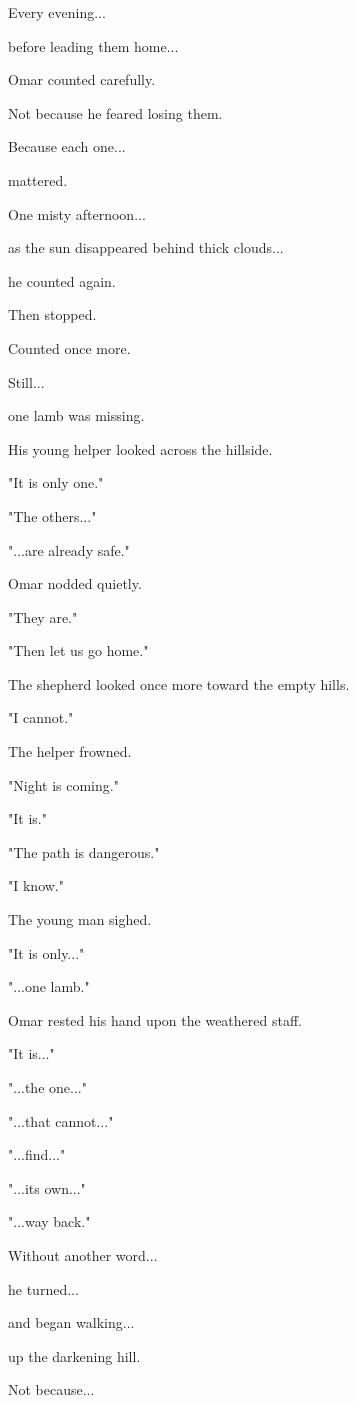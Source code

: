 \documentclass[12pt,openany]{book}
\begin{document}
Every evening...

before leading them home...

Omar counted carefully.

Not because he feared losing them.

Because each one...

mattered.

One misty afternoon...

as the sun disappeared behind thick clouds...

he counted again.

Then stopped.

Counted once more.

Still...

one lamb was missing.

His young helper looked across the hillside.

"It is only one."

"The others..."

"...are already safe."

Omar nodded quietly.

"They are."

"Then let us go home."

The shepherd looked once more toward the empty hills.

"I cannot."

The helper frowned.

"Night is coming."

"It is."

"The path is dangerous."

"I know."

The young man sighed.

"It is only..."

"...one lamb."

Omar rested his hand upon the weathered staff.

"It is..."

"...the one..."

"...that cannot..."

"...find..."

"...its own..."

"...way back."

Without another word...

he turned...

and began walking...

up the darkening hill.

Not because...
\end{document}
